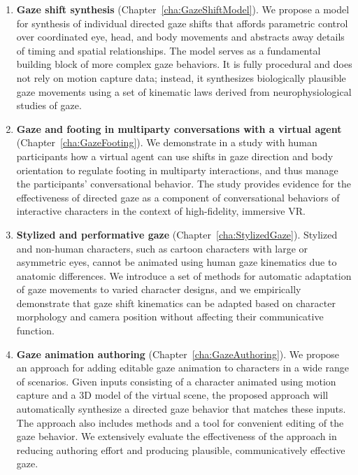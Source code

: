 \begin{enumerate}
\item \textbf{Gaze shift synthesis} (Chapter~\ref{cha:GazeShiftModel}). We propose a model for synthesis of individual directed gaze shifts that affords parametric control over coordinated eye, head, and body movements and abstracts away details of timing and spatial relationships. The model serves as a fundamental building block of more complex gaze behaviors. It is fully procedural and does not rely on motion capture data; instead, it synthesizes biologically plausible gaze movements using a set of kinematic laws derived from neurophysiological studies of gaze.
\item \textbf{Gaze and footing in multiparty conversations with a virtual agent} (Chapter~\ref{cha:GazeFooting}). We demonstrate in a study with human participants how a virtual agent can use shifts in gaze direction and body orientation to regulate footing in multiparty interactions, and thus manage the participants' conversational behavior. The study provides evidence for the effectiveness of directed gaze as a component of conversational behaviors of interactive characters in the context of high-fidelity, immersive VR.
\item \textbf{Stylized and performative gaze} (Chapter~\ref{cha:StylizedGaze}). Stylized and non-human characters, such as cartoon characters with large or asymmetric eyes, cannot be animated using human gaze kinematics due to anatomic differences. We introduce a set of methods for automatic adaptation of gaze movements to varied character designs, and we empirically demonstrate that gaze shift kinematics can be adapted based on character morphology and camera position without affecting their communicative function.
\item \textbf{Gaze animation authoring} (Chapter~\ref{cha:GazeAuthoring}). We propose an approach for adding editable gaze animation to characters in a wide range of scenarios. Given inputs consisting of a character animated using motion capture and a 3D model of the virtual scene, the proposed approach will automatically synthesize a directed gaze behavior that matches these inputs. The approach also includes methods and a tool for convenient editing of the gaze behavior. We extensively evaluate the effectiveness of the approach in reducing authoring effort and producing plausible, communicatively effective gaze.
\end{enumerate}

